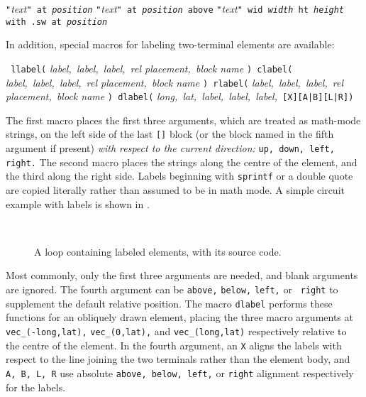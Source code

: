    {\tt "}{\sl text}{\tt" at {\sl position}}\NVL
   {\tt "}{\sl text}{\tt" at {\sl position} above}\NVL
   {\tt "}{\sl text}{\tt" wid {\sl width} ht {\sl height} 
     with .sw at {\sl position}}\NVL

   In addition, special macros for labeling two-terminal elements are available:
\par
{\tt
   llabel(} {\sl label,\ label,\ label,\ rel placement,\ block name} {\tt )
      \hfill\break\hspace*{\parindent}%
   clabel(} {\sl label,\ label,\ label,\ rel placement,\ block name} {\tt )
      \hfill\break\hspace*{\parindent}%
   rlabel(} {\sl label,\ label,\ label,\ rel placement,\ block name} {\tt )
      \hfill\break\hspace*{\parindent}%
   dlabel(} {\sl long,\ lat,\ label,\ label,\ label,\ }{\tt[X][A|B][L|R])}

The first macro places the first three arguments, which are treated
as math-mode strings, on the left side of the last {\tt []} block (or
the block named in the fifth argument if present) {\em with respect to
the current direction:} {\tt up, down, left, right.} The second macro
places the strings along the centre of the element, and the third along
the right side.  Labels beginning with {\tt sprintf} or a double quote
are copied literally rather than assumed to be in math mode.  A simple
circuit example with labels is shown in .
\begin{figure}[h!t]
   \vspace*{-\baselineskip}
   \parbox{4in}{\small }%
   \hfill\raise-0.5in\hbox{ }
   \vspace*{-\baselineskip}
   \caption{A loop containing labeled elements, with its source code.}
   \label{Loop}
   \end{figure}
Most commonly, only
the first three arguments are needed, and blank arguments are ignored.
The fourth argument can be {\tt above,} {\tt below,} {\tt left,} or {\tt
right} to supplement the default relative position.
The macro {\tt dlabel} performs these functions for an
obliquely drawn element, placing the three macro arguments at
{\tt vec\_(-long,lat),} {\tt vec\_(0,lat),} and {\tt vec\_(long,lat)}
respectively relative to the centre of the element.
In the fourth argument, an {\tt X} aligns the labels with respect to the line
joining the two terminals rather than the element body, and
{\tt A, B, L, R} use absolute {\tt above, below, left,} or {\tt right} alignment
respectively for the labels.


